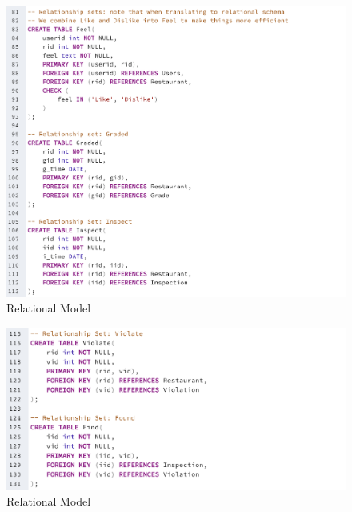 \documentclass[a4paper,12pt]{article}
\theoremstyle{definition}
\begin{document}
\begin{figure}[h]
    \centering
    \includegraphics[scale = 0.53]{4.png}
    \caption{Relational Model}
    \label{fig:4}
\end{figure}
\begin{figure}[h]
    \centering
    \includegraphics[scale = 0.58]{5.png}
    \caption{Relational Model}
    \label{fig:5}
\end{figure}



\newpage
\end{document}
